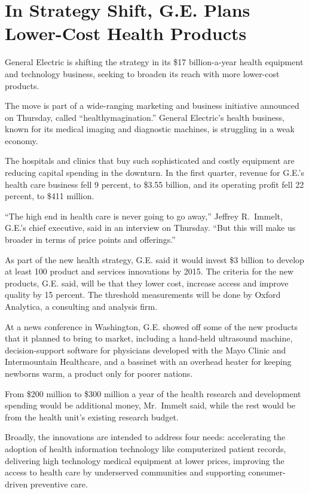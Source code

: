 \documentclass[12pt,a4paper,onecolumn]{article}
\begin{document}
\section{In Strategy Shift, G.E. Plans Lower-Cost Health Products}

General Electric is shifting the strategy in its \$17 billion-a-year health equipment and technology
business, seeking to broaden its reach with more lower-cost products.

The move is part of a wide-ranging marketing and business initiative announced on Thursday, called
``healthymagination.'' General Electric's health business, known for its medical imaging and
diagnostic machines, is struggling in a weak economy.

The hospitals and clinics that buy such sophisticated and costly equipment are reducing capital
spending in the downturn. In the first quarter, revenue for G.E.'s health care business fell 9
percent, to \$3.55 billion, and its operating profit fell 22 percent, to \$411 million.

``The high end in health care is never going to go away,'' Jeffrey R.~Immelt, G.E.'s chief
executive, said in an interview on Thursday. ``But this will make us broader in terms of price
points and offerings.''

As part of the new health strategy, G.E. said it would invest \$3 billion to develop at least 100
product and services innovations by 2015. The criteria for the new products, G.E. said, will be that
they lower cost, increase access and improve quality by 15 percent. The threshold measurements will
be done by Oxford Analytica, a consulting and analysis firm.

At a news conference in Washington, G.E. showed off some of the new products that it planned to
bring to market, including a hand-held ultrasound machine, decision-support software for physicians
developed with the Mayo Clinic and Intermountain Healthcare, and a bassinet with an overhead heater
for keeping newborns warm, a product only for poorer nations.

From \$200 million to \$300 million a year of the health research and development spending would be
additional money, Mr.~Immelt said, while the rest would be from the health unit's existing research
budget.

Broadly, the innovations are intended to address four needs: accelerating the adoption of health
information technology like computerized patient records, delivering high technology medical
equipment at lower prices, improving the access to health care by underserved communities and
supporting consumer-driven preventive care.
\end{document}
